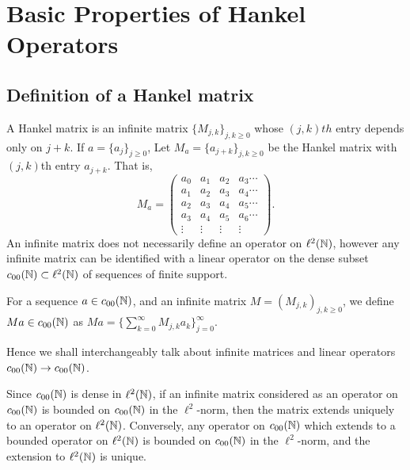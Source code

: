 
\chapter{Basic Properties of Hankel Operators} %

\label{PropertiesOfHankelOperators} %




\section{Definition of a Hankel matrix}
A Hankel matrix is an infinite matrix $\{M_{j,k}\}_{j,k \geq 0}$
whose $(j,k)th$ entry depends only on $j+k$. If $a = \{a_j\}_{j\geq 0}$,
Let $M_a = \{a_{j+k}\}_{j,k\geq 0}$ be the Hankel matrix with $(j,k)$th
entry $a_{j+k}$. That is,
\begin{equation*}
    M_a = \begin{pmatrix}
        a_0 & a_1 & a_2 & a_3 \cdots\\
        a_1 & a_2 & a_3 & a_4 \cdots\\
        a_2 & a_3 & a_4 & a_5 \cdots\\
        a_3 & a_4 & a_5 & a_6 \cdots\\
        \vdots & \vdots & \vdots & \vdots 
    \end{pmatrix}.
\end{equation*}
An infinite matrix does not necessarily define an operator on $\ell^2(\mathbb{N})$, 
however any infinite matrix can be identified with a linear operator 
on the dense subset $c_{00}(\mathbb{N}) \subset \ell^2(\mathbb{N})$ of sequences
of finite support. 

For a sequence $a \in c_{00}(\mathbb{N})$, and an infinite matrix $M = (M_{j,k})_{j,k\geq 0}$, 
we define $Ma \in c_{00}(\mathbb{N})$ as $Ma = \{\sum_{k=0}^\infty M_{j,k}a_k\}_{j=0}^\infty$.

Hence we shall interchangeably talk about infinite matrices and linear
operators $c_{00}(\mathbb{N})\rightarrow c_{00}(\mathbb{N})$.

Since $c_{00}(\mathbb{N})$ is dense in $\ell^2(\mathbb{N})$, if an infinite matrix
considered as an operator on $c_{00}(\mathbb{N})$ is bounded on $c_{00}(\mathbb{N})$
in the $\ell^2$-norm, then the matrix extends uniquely to an operator on $\ell^2(\mathbb{N})$.
Conversely, any operator on $c_{00}(\mathbb{N})$ which extends to a bounded
operator on $\ell^2(\mathbb{N})$ is bounded on $c_{00}(\mathbb{N})$ in the $\ell^2$-norm,
and the extension to $\ell^2(\mathbb{N})$ is unique.


